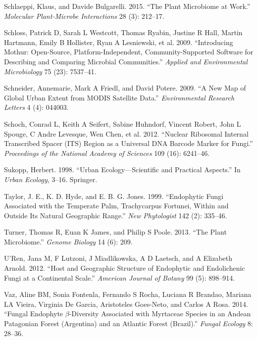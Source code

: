\documentclass[fleqn,10pt,lineno]{wlpeerj} %
\newlength{\cslhangindent}
\newenvironment{CSLReferences}[2] %
 {%
  \setlength{\parindent}{0pt}
  \ifodd #1 \everypar{\setlength{\hangindent}{\cslhangindent}}\ignorespaces\fi
  \ifnum #2 > 0
  \setlength{\parskip}{#2\baselineskip}
  \fi
 }%
 {}
\begin{document}
\begin{CSLReferences}{1}{0}
\leavevmode{}%
Schlaeppi, Klaus, and Davide Bulgarelli. 2015. {``The Plant Microbiome at Work.''} \emph{Molecular Plant-Microbe Interactions} 28 (3): 212--17.

\leavevmode{}%
Schloss, Patrick D, Sarah L Westcott, Thomas Ryabin, Justine R Hall, Martin Hartmann, Emily B Hollister, Ryan A Lesniewski, et al. 2009. {``Introducing Mothur: Open-Source, Platform-Independent, Community-Supported Software for Describing and Comparing Microbial Communities.''} \emph{Applied and Environmental Microbiology} 75 (23): 7537--41.

\leavevmode{}%
Schneider, Annemarie, Mark A Friedl, and David Potere. 2009. {``A New Map of Global Urban Extent from MODIS Satellite Data.''} \emph{Environmental Research Letters} 4 (4): 044003.

\leavevmode{}%
Schoch, Conrad L, Keith A Seifert, Sabine Huhndorf, Vincent Robert, John L Spouge, C Andre Levesque, Wen Chen, et al. 2012. {``Nuclear Ribosomal Internal Transcribed Spacer (ITS) Region as a Universal DNA Barcode Marker for Fungi.''} \emph{Proceedings of the National Academy of Sciences} 109 (16): 6241--46.

\leavevmode{}%
Sukopp, Herbert. 1998. {``Urban Ecology---Scientific and Practical Aspects.''} In \emph{Urban Ecology}, 3--16. Springer.

\leavevmode{}%
Taylor, J. E., K. D. Hyde, and E. B. G. Jones. 1999. {``Endophytic Fungi Associated with the Temperate Palm, Trachycarpus Fortunei, Within and Outside Its Natural Geographic Range.''} \emph{New Phytologist} 142 (2): 335--46.

\leavevmode{}%
Turner, Thomas R, Euan K James, and Philip S Poole. 2013. {``The Plant Microbiome.''} \emph{Genome Biology} 14 (6): 209.

\leavevmode{}%
U'Ren, Jana M, F Lutzoni, J Miadlikowska, A D Laetsch, and A Elizabeth Arnold. 2012. {``Host and Geographic Structure of Endophytic and Endolichenic Fungi at a Continental Scale.''} \emph{American Journal of Botany} 99 (5): 898--914.

\leavevmode{}%
Vaz, Aline BM, Sonia Fontenla, Fernando S Rocha, Luciana R Brandao, Mariana LA Vieira, Virginia De Garcia, Aristoteles Goes-Neto, and Carlos A Rosa. 2014. {``Fungal Endophyte \(\beta\)-Diversity Associated with Myrtaceae Species in an Andean Patagonian Forest (Argentina) and an Atlantic Forest (Brazil).''} \emph{Fungal Ecology} 8: 28--36.


\end{CSLReferences}
\end{document}
